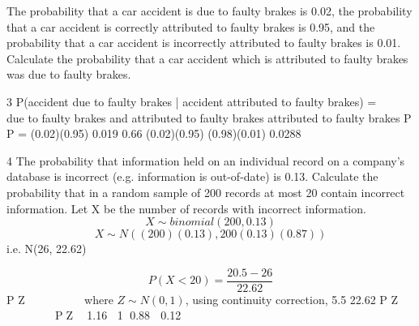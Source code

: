 \documentclass[a4paper,12pt]{article}
\begin{document}
 The probability that a car accident is due to faulty brakes is 0.02, the probability that a
car accident is correctly attributed to faulty brakes is 0.95, and the probability that a
car accident is incorrectly attributed to faulty brakes is 0.01.
Calculate the probability that a car accident which is attributed to faulty brakes was
due to faulty brakes. 

3 P(accident due to faulty brakes | accident attributed to faulty brakes)
=  
 
due to faulty brakes and attributed to faulty brakes
attributed to faulty brakes
P
P
= (0.02)(0.95) 0.019 0.66
(0.02)(0.95) (0.98)(0.01) 0.0288
 


\newpage 

4 The probability that information held on an individual record on a company's
database is incorrect (e.g. information is out-of-date) is 0.13.
Calculate the probability that in a random sample of 200 records at most 20 contain
incorrect information.
 Let X be the number of records with incorrect information.
\[X \sim binomial(200, 0.13)\]
\[X \sim  N((200)(0.13), 200(0.13)(0.87)) \]
i.e. N(26, 22.62)

\[ P(X < 20) = \frac{20.5 - 26}{22.62}\]
P Z
  
   
 	
where $Z \sim N(0,1)$, using continuity correction,
5.5
22.62
P Z
  
   
 	
 PZ  1.16 1 0.88  0.12
\end{document}
